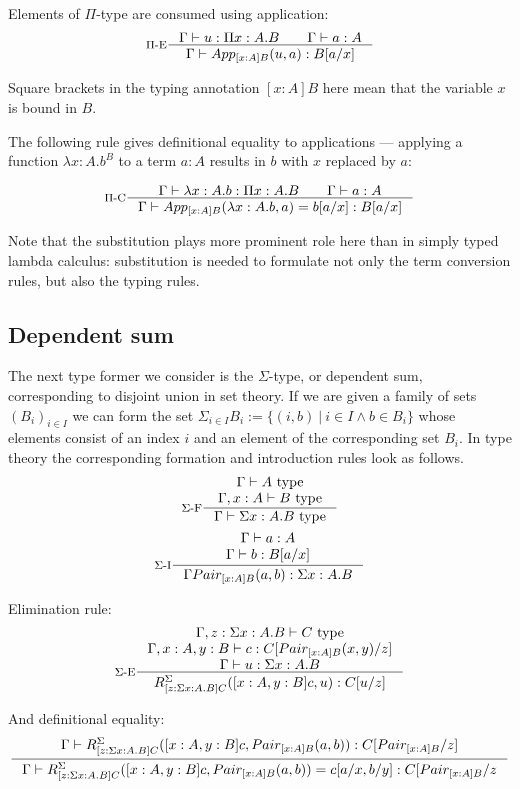 Elements of $\Pi$-type are consumed using application:
\[
  \inference[$\Pi$-E]{\Gamma \vdash u : \Pi x:A. B \qquad \Gamma \vdash a : A}
  {\Gamma \vdash App_{[x:A]B}(u, a): B[a / x]}
\]

Square brackets in the typing annotation $[x : A] B$ here mean that the
variable $x$ is bound in $B$.

The following rule gives definitional equality to applications --- applying a
function $\lambda x : A. b^B$ to a term $a : A$ results in $b$ with $x$
replaced by $a$:

\[
  \inference[$\Pi$-C]{\Gamma \vdash \lambda x : A. b : \Pi x:A. B \qquad \Gamma \vdash a : A}
  {\Gamma \vdash App_{[x:A]B}(\lambda x : A. b, a) = b[a / x]: B [a / x]}
\]

Note that the substitution plays more prominent role here than in simply typed
lambda calculus: substitution is needed to formulate not only the term
conversion rules, but also the typing rules.

\subsection*{Dependent sum}

The next type former we consider is the $\Sigma$-type, or dependent sum,
corresponding to disjoint union in set theory. If we are given a family of sets
$(B_i)_{i \in I}$ we can form the set $\Sigma_{i \in I} B_i := \{ (i, b)~|~i
\in I \land b \in B_i\}$ whose elements consist of an index $i$ and an element
of the corresponding set $B_i$. In type theory the corresponding formation and
introduction rules look as follows.
\[
  \inference[$\Sigma$-F]{\Gamma \vdash A \text{ type}\\ \Gamma, x:A \vdash B \text{ type}}{\Gamma \vdash \Sigma x : A. B \text{ type}}
\]
\[
  \inference[$\Sigma$-I]{\Gamma \vdash a : A\\ \Gamma\vdash b: B[a / x]}{\Gamma Pair_{[x:A]B} (a,b) : \Sigma x : A. B}
\]

Elimination rule:
\[
  \inference[$\Sigma$-E]{\Gamma, z : \Sigma x: A. B \vdash C \text{ type}\\ \Gamma, x: A, y: B \vdash c : C[Pair_{[x:A]B}(x, y)/z]\\ \Gamma \vdash u : \Sigma x: A. B}
  {R^\Sigma_{[z : \Sigma x: A. B]C}([x : A, y: B]c, u): C[u/z]}
\]

And definitional equality:
\[
  \inference{\Gamma\vdash R^\Sigma_{[z : \Sigma x: A. B]C}([x : A, y: B]c, Pair_{[x:A]B}(a,b)): C[Pair_{[x:A]B}/z]}
  {\Gamma\vdash R^\Sigma_{[z : \Sigma x: A. B]C}([x : A, y: B]c, Pair_{[x:A]B}(a,b)) = c[a/x,b/y] : C [Pair_{[x:A]B}/z}
\]

